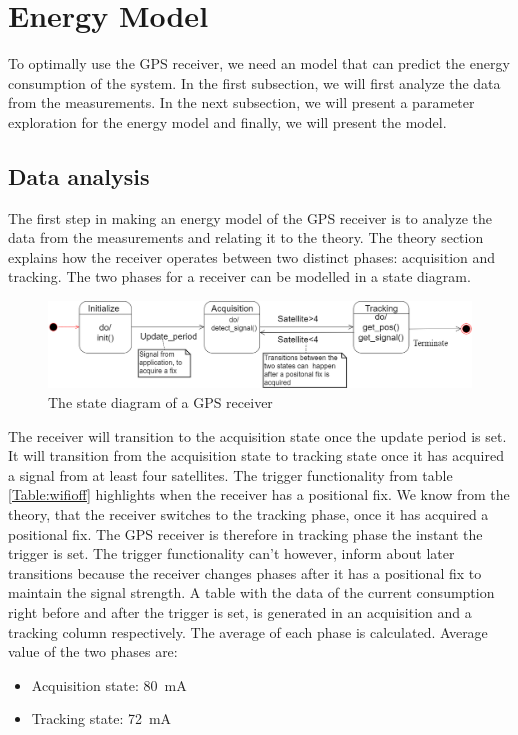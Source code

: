  \chapter{Energy Model}
 To optimally use the GPS receiver, we need an model that can predict the energy consumption of the system. In the first subsection, we will first analyze the data from the measurements. In the next subsection, we will present a parameter exploration for the energy model and finally, we will present the model. 
 \section{Data analysis}
 The first step in making an energy model of the GPS receiver is to analyze the data from the measurements and relating it to the theory. The theory section explains how the receiver operates between two distinct phases: acquisition and tracking. The two phases for a receiver can be modelled in a state diagram. 
 
 
\begin{figure}[H]
\centering
\includegraphics[width=16 cm]{Project_Report/Images/Basic_state_GPS.png}
\caption{The state diagram of a GPS receiver}
\label{fig:GPS reciever}
\end{figure}
The receiver will transition to the acquisition state once the update period is set. It will transition from the acquisition state to tracking state once it has acquired a signal from at least four satellites. 
The trigger functionality from table \ref{Table:wifioff} highlights when the receiver has a positional fix. We know from the theory, that the receiver switches to the tracking phase, once it has acquired a positional fix. The GPS receiver is therefore in tracking phase the instant the trigger is set. The trigger functionality can't however, inform about later transitions because the receiver changes phases after it has a positional fix to maintain the signal strength. A table with the data of the current consumption right before and after the trigger is set, is generated in an acquisition and a tracking column respectively. The average of each phase is calculated.  Average value of the two phases are:
\begin{itemize}
    \item Acquisition state: 80 \,mA
    \item Tracking state: 72 \,mA
\end{itemize}


